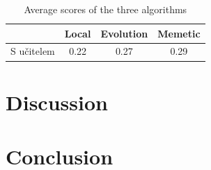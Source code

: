 \documentclass[journal]{IEEEtrancz}
\begin{document}
\begin{table}
  \centering
  \caption{Average scores of the three algorithms}
  \begin{tabular}{|l||c|c|c|}
  \hline
    & Local & Evolution & Memetic \\
  \hline
  \hline
  S učitelem  & 0.22 & 0.27 & 0.29 \\
  \hline
  \end{tabular}
  \label{tab:extab}
\end{table}



\section{Discussion}

\section{Conclusion}
\end{document}
